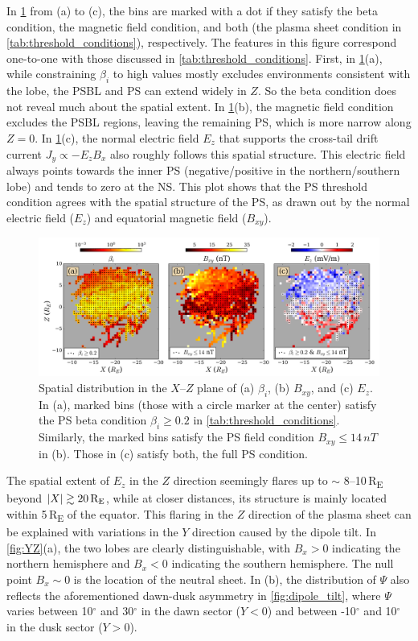 \documentclass[draft]{agujournal2019}
\begin{document}
In \cref{fig:XZ} from (a) to (c), the bins are marked with a dot if they satisfy the beta condition, the magnetic field condition, and both (the plasma sheet condition in \cref{tab:threshold_conditions}), respectively. The features in this figure correspond one-to-one with those discussed in \cref{tab:threshold_conditions}. First, in \cref{fig:XZ}(a), while constraining $\beta_i$ to high values mostly excludes environments consistent with the lobe, the PSBL and PS can extend widely in $Z$. So the beta condition does not reveal much about the spatial extent. In \cref{fig:XZ}(b), the magnetic field condition excludes the PSBL regions, leaving the remaining PS, which is more narrow along ${Z=0}$. In \cref{fig:XZ}(c), the normal electric field $E_z$ that supports the cross-tail drift current ${J_y\propto-E_zB_x}$ also roughly follows this spatial structure. This electric field always points towards the inner PS (negative/positive in the northern/southern lobe) and tends to zero at the NS. This plot shows that the PS threshold condition agrees with the spatial structure of the PS, as drawn out by the normal electric field ($E_z$) and equatorial magnetic field ($B_{xy}$).

\begin{figure}
\centering
\noindent\includegraphics[width=\textwidth]{2023JA031358R-f06.pdf}
\caption{
Spatial distribution in the $X$--$Z$ plane of (a) $\beta_i$, (b) $B_{xy}$, and (c) $E_z$. In (a), marked bins (those with a circle marker at the center) satisfy the PS beta condition ${\beta_i\geq0.2}$ in \cref{tab:threshold_conditions}. Similarly, the marked bins satisfy the PS field condition ${B_{xy}\leq 14\,\si{nT}}$ in (b). Those in (c) satisfy both, the full PS condition.
}
\label{fig:XZ}
\end{figure}

The spatial extent of $E_z$ in the $Z$ direction seemingly flares up to $\sim$ 8--10\,\si{R_E} beyond ${\abs{X}\gtrsim20\,\si{R_E}}$, while at closer distances, its structure is mainly located within 5\,\si{R_E} of the equator. This flaring in the $Z$ direction of the plasma sheet can be explained with variations in the $Y$ direction caused by the dipole tilt. In \mbox{\cref{fig:YZ}(a)}, the two lobes are clearly distinguishable, with ${B_x>0}$ indicating the northern hemisphere and ${B_x<0}$ indicating the southern hemisphere. The null point ${B_x\sim0}$ is the location of the neutral sheet. In (b), the distribution of $\Psi$ also reflects the aforementioned dawn-dusk asymmetry in \mbox{\cref{fig:dipole_tilt}}, where $\Psi$ varies between 10$^\circ$ and 30$^\circ$ in the dawn sector ($Y<0$) and between -10$^\circ$ and 10$^\circ$ in the dusk sector ($Y>0$).
\end{document}
